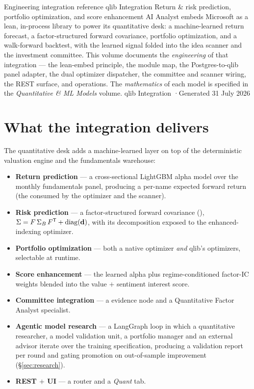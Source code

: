 \documentclass[11pt]{article}
\begin{document}
\mzqatitlepage
  {Engineering integration reference}
  {qlib Integration}
  {Return \& risk prediction, portfolio optimization, and score enhancement}
  {AI Analyst embeds Microsoft  as a lean, in-process library to power
   its quantitative desk: a machine-learned return forecast, a factor-structured
   forward covariance, portfolio optimization, and a walk-forward backtest, with
   the learned signal folded into the idea scanner and the investment committee.
   This volume documents the \emph{engineering} of that integration --- the
   lean-embed principle, the module map, the Postgres-to-qlib panel adapter, the
   dual optimizer dispatcher, the committee and scanner wiring, the REST surface,
   and operations. The \emph{mathematics} of each model is specified in the
   \emph{Quantitative \& ML Models} volume.}
  {qlib Integration \quad·\quad Generated 31 July 2026}

\mzqatoc
\clearpage

\section{What the integration delivers}

The quantitative desk adds a machine-learned layer on top of the deterministic
valuation engine and the fundamentals warehouse:

\begin{itemize}
  \item \textbf{Return prediction} --- a cross-sectional LightGBM alpha model over
        the monthly fundamentals panel, producing a per-name expected forward
        return (the  consumed by the optimizer and the scanner).
  \item \textbf{Risk prediction} --- a factor-structured forward covariance
        (), $\Sigma=F\,\Sigma_B\,F^{\mathsf{T}}+\operatorname{diag}(\mathbf d)$,
        with its decomposition exposed to the enhanced-indexing optimizer.
  \item \textbf{Portfolio optimization} --- both a native optimizer \emph{and}
        qlib's optimizers, selectable at runtime.
  \item \textbf{Score enhancement} --- the learned alpha plus regime-conditioned
        factor-IC weights blended into the value $+$ sentiment interest score.
  \item \textbf{Committee integration} --- a  evidence node and
        a Quantitative Factor Analyst specialist.
  \item \textbf{Agentic model research} --- a LangGraph loop in which a quantitative
        researcher, a model validation unit, a portfolio manager and an external
        advisor iterate over the training specification, producing a validation
        report per round and gating promotion on out-of-sample improvement
        (\S\ref{sec:research}).
  \item \textbf{REST $+$ UI} --- a  router and a \emph{Quant} tab.
\end{itemize}
\end{document}
